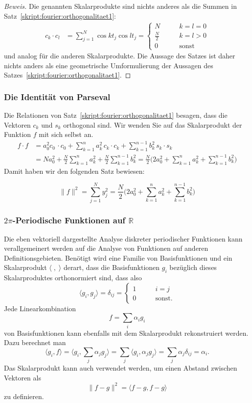 \begin{proof}[Beweis]
Die genannten Skalarprodukte sind nichts anderes als die Summen in
Satz~\ref{skript:fourier:orthogonalitaet1}:
\begin{align*}
c_k\cdot c_l
&=
\sum_{j=1}^N \cos kt_j \cos lt_j
=
\begin{cases}
N&\qquad k=l=0\\
\displaystyle\frac{N}2&\qquad k=l>0\\
0&\qquad\text{sonst}
\end{cases}
\end{align*}
und analog für die anderen Skalarprodukte.
Die Aussage des Satzes ist daher nichts anders als eine geometrische
Umformulierung der Aussagen des
Satzes~\ref{skript:fourier:orthogonalitaet1}.
\end{proof}

\subsubsection{Die Identität von Parseval}
Die Relationen von
Satz~\ref{skript:fourier:orthogonalitaet1}
besagen, dass die Vektoren $c_k$ und $s_k$ orthogonal sind.
Wir wenden Sie auf das Skalarprodukt der Funktion $f$ mit sich selbst an.
\begin{align*}
f\cdot f
&=
a_0^2 c_0\,\cdot c_0
+
\sum_{k=1}^na_k^2 \,c_k\cdot c_k
+
\sum_{k=1}^{n-1} b_k^2\,s_k\cdot s_k
\\
&=
Na_0^2
+
\frac{N}2\sum_{k=1}^n a_k^2
+
\frac{N}2\sum_{k=1}^{n-1} b_k^2
=
\frac{N}2
\biggl(
2a_0^2
+
\sum_{k=1}^n a_k^2
+
\sum_{k=1}^{n-1} b_k^2
\biggr)
\end{align*}
Damit haben wir den folgenden Satz bewiesen:
\begin{satz}[Parseval]
\[
\|f\|^2
=
\sum_{j=1}^N y_j^2
=
\frac{N}2
\biggl(
2a_0^2
+
\sum_{k=1}^n a_k^2
+
\sum_{k=1}^{n-1} b_k^2
\biggr)
\]
\end{satz}

\subsubsection{$2\pi$-Periodische Funktionen auf $\mathbb R$}
Die eben vektoriell dargestellte Analyse diskreter periodischer Funktionen 
kann verallgemeinert werden auf die Analyse von Funktionen auf
anderen Definitionsgebieten.
Benötigt wird eine Familie von Basisfunktionen und ein Skalarprodukt
$\langle\;,\;\rangle$ derart, dass die Basisfunktionen $g_i$ bezüglich
dieses Skalarproduktes orthonormiert sind, dass also
\[
\langle g_i,g_j\rangle
=
\delta_{ij}
=
\begin{cases}
1&\qquad i=j\\
0&\qquad\text{sonst}.
\end{cases}
\]
Jede Linearkombination
\[
f = \sum_{i} \alpha_i g_i
\]
von Basisfunktionen kann ebenfalls mit dem Skalarprodukt rekonstruiert
werden.
Dazu berechnet man
\[
\langle g_i,f\rangle
=
\biggl\langle
g_i,\sum_j\alpha_jg_j
\biggr\rangle
=
\sum_j \langle g_i,\alpha_jg_j\rangle
=
\sum_j \alpha_j\delta_{ij}
=
\alpha_i.
\]
Das Skalarprodukt kann auch verwendet werden, um einen Abstand zwischen
Vektoren als
\[
\| f-g\|^2
=
\langle f-g,f-g\rangle
\]
zu definieren.


